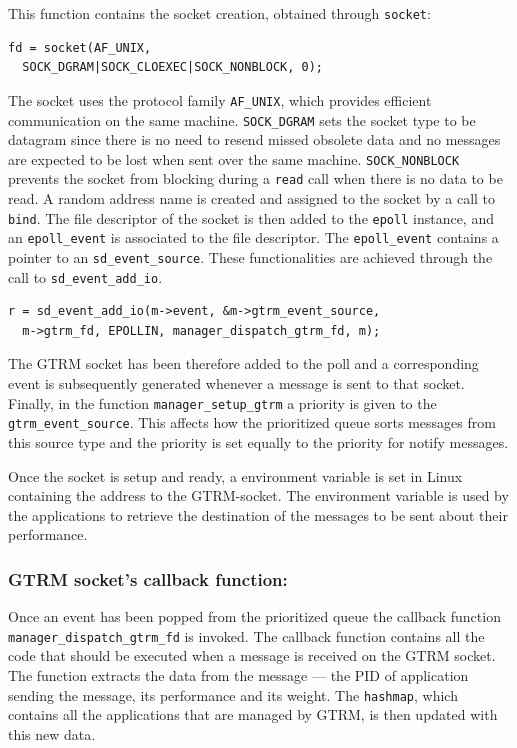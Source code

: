 \documentclass[nobiblatex]{LTHthesis}
\begin{document}
This function contains the socket creation, obtained through
\texttt{socket}:
\begin{verbatim}
fd = socket(AF_UNIX, 
  SOCK_DGRAM|SOCK_CLOEXEC|SOCK_NONBLOCK, 0);
\end{verbatim}
The socket uses the protocol family \texttt{AF\_UNIX}, which provides
efficient communication on the same machine. \texttt{SOCK\_DGRAM} sets 
the socket type to be datagram since there is no need to resend missed
obsolete data and no messages are expected to be lost when sent over the 
same machine. \texttt{SOCK\_NONBLOCK} prevents the socket from blocking 
during a \texttt{read} call when there is no data to be read. A random 
address name is created and assigned to the socket by a call to 
\texttt{bind}. The file descriptor of the socket is then added to the 
\texttt{epoll} instance, and an \texttt{epoll\_event} is associated to
the file descriptor. The \texttt{epoll\_event} contains a pointer to 
an \texttt{sd\_event\_source}. These functionalities are achieved through
the call to \texttt{sd\_event\_add\_io}.

\begin{verbatim}
r = sd_event_add_io(m->event, &m->gtrm_event_source, 
  m->gtrm_fd, EPOLLIN, manager_dispatch_gtrm_fd, m);
\end{verbatim}

The GTRM socket has been therefore added to the poll and a corresponding 
event is subsequently generated whenever a message is sent to that socket. 
Finally, in the function \texttt{manager\_setup\_gtrm} a priority is given
to the \texttt{gtrm\_event\_source}. This affects how the prioritized 
queue sorts messages from this source type and the priority is set equally
to the priority for notify messages.

Once the socket is setup and ready, a environment variable is set in 
Linux containing the address to the GTRM-socket. The environment variable is
used by the applications to retrieve the destination of the messages to be
sent about their performance.

\subsubsection{GTRM socket's callback function:}
Once an event has been popped from the prioritized queue the callback 
function \texttt{manager\_dispatch\_gtrm\_fd} is invoked. 
The callback function contains all the code that should be executed when a
message is received on the GTRM socket. The function extracts the data 
from the message --- the PID of application sending the message, its
performance and its weight. The \texttt{hashmap}, which contains all the
applications that are managed by GTRM, is then updated with this new data. 
\end{document}

